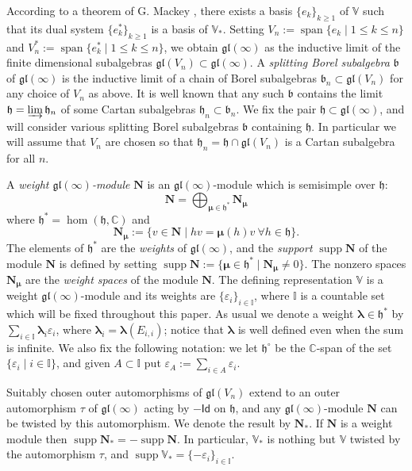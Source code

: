 \documentclass[11pt,fleqn]{amsart}
\newcommand\CC{\mathbb C}
\newcommand\II{\mathbb I}
\renewcommand\epsilon{\varepsilon}
\theoremstyle{definition}
\theoremstyle{remark}
\theoremstyle{remark}
\newcommand\VV{\mathbb V}
\newcommand\gl{\mathfrak{gl}}
\newcommand\Id{\mathsf{Id}}
\newcommand\lie[1]{\mathfrak{#1}}
\newcommand\wt[1]{\boldsymbol{#1}}
\DeclareMathOperator\supp{supp}
\newcommand\vspan[1]{\operatorname{span}{\{#1\}}}
\begin{document}
According to a theorem of G. Mackey \cite{Mackey45}, there exists a basis 
$\{e_k\}_{k \geq 1}$ of $\VV$ such that its dual system $\{e_k^*\}_{k \geq 1}$
is a basis of $\VV_*$. Setting $V_n := \vspan{e_k \mid 1 \leq k \leq n}$ and 
$V_n^* := \vspan{ e_k^* \mid 1 \leq k \leq n}$, we obtain $\gl(\infty)$ as the
inductive limit of the finite dimensional subalgebras $\gl(V_n) \subset 
\gl(\infty)$. A \emph{splitting Borel subalgebra} $\lie b$ of $\gl(\infty)$ is 
the inductive limit of a chain of Borel subalgebras $\lie b_n \subset \gl(V_n)$ 
for any choice of $V_n$ as above. It is well known that any such $\lie b$ 
contains the limit $\lie h = \varinjlim \lie h_n$ of some Cartan subalgebras 
$\lie h_n 
\subset \lie b_n$. We fix the pair $\lie h \subset \gl(\infty)$, and will 
consider various splitting Borel subalgebras $\lie b$ containing $\lie h$. In 
particular we will assume that $V_n$ are chosen so that $\lie h_n = \lie h 
\cap \gl(V_n)$ is a Cartan subalgebra for all $n$.

A \emph{weight $\gl(\infty)$-module} $\mathbf N$ is an $\gl(\infty)$-module which 
is semisimple over $\lie h$:
\[\mathbf N = \bigoplus_{\wt\mu \in \lie h^*} \mathbf N_{\wt\mu}\]
where $\lie h^* = \hom(\lie h, \CC)$ and 
\[\mathbf N_{\wt\mu} := \{v \in \mathbf N \mid hv = \wt\mu(h)v \  \forall 
  h \in \lie h\}.\]
The elements of $\lie h^*$ are the \emph{weights} of $\gl(\infty)$, and the 
\emph{support} $\supp \mathbf N$ of the module $\mathbf N$ is defined by setting 
$\supp \mathbf N := \{\wt\mu \in \lie h^* \mid  \mathbf N_{\wt\mu} \neq 0\}$. The 
nonzero spaces $\mathbf N_{\wt\mu}$ are the \emph{weight spaces} of the module 
$\mathbf N$. The defining representation $\VV$
is a weight $\gl(\infty)$-module and its weights are $\{\epsilon_i\}_{i \in 
\II}$, where $\II$ is a countable set which will be fixed throughout this paper.
As usual we denote a weight $\wt\lambda \in \lie h^*$ by $\sum_{i \in \II} 
\wt\lambda_i \epsilon_i$, where $\wt\lambda_i = \wt\lambda(E_{i,i})$; notice that
$\wt\lambda$ is well defined even when the sum is infinite. We also fix the 
following notation: we let $\lie h^\circ$ be the $\CC$-span of the set
$\{\epsilon_i\mid i \in \II\}$, and given $A \subset \II$ put $\epsilon_A := 
\sum_{i \in A} \epsilon_i$.

Suitably chosen outer automorphisms of $\gl(V_n)$ extend to an 
outer automorphism $\tau$ of $\gl(\infty)$ acting by $-\Id$ on $\lie h$, and 
any $\gl(\infty)$-module $\mathbf N$ can be twisted by this automorphism. We 
denote the result by $\mathbf N_*$. If $\mathbf N$ is a weight module then 
$\supp \mathbf N_* = - \supp \mathbf N$. In particular, $\VV_*$ is nothing but
$\VV$ twisted by the automorphism $\tau$, and $\supp \VV_* = \{-\epsilon_i
\}_{i \in \II}$.
\end{document}
